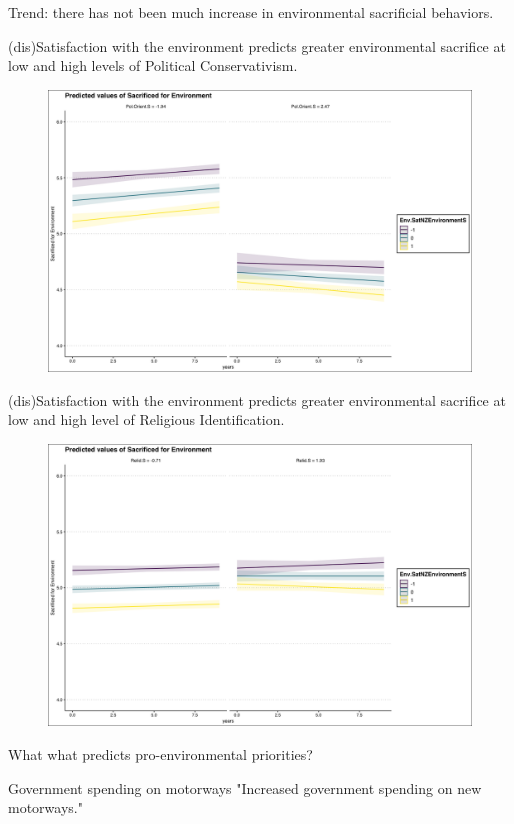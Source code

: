 \documentclass{beamer}
\begin{document}
\begin{frame}{Trend: there has not been much increase in environmental sacrificial behaviors.}
\begin{frame}{(dis)Satisfaction with the environment predicts greater environmental sacrifice at low and high levels of Political Conservativism.}
\begin{figure}
\includegraphics[width=.8\textwidth,height=\textheight,keepaspectratio]{Figures/X_SACRIFICEMADE_Env.SatNZEnvironmentS_Pol.Orient.S.png}
\end{figure}
\end{frame}

\begin{frame}{(dis)Satisfaction with the environment predicts greater environmental sacrifice at low and high level of Religious Identification.}
\begin{figure}
\includegraphics[width=.8\textwidth,height=\textheight,keepaspectratio]{Figures/X_SACRIFICEMADE_Env.SatNZEnvironmentS_Relid.S.png}
\end{figure}
\end{frame}

\begin{frame}{What what predicts pro-environmental priorities?}

\begin{alertblock}{Government spending on motorways}
"Increased government spending on new motorways."
\end{alertblock}


\end{frame}
\end{frame}
\end{document}
